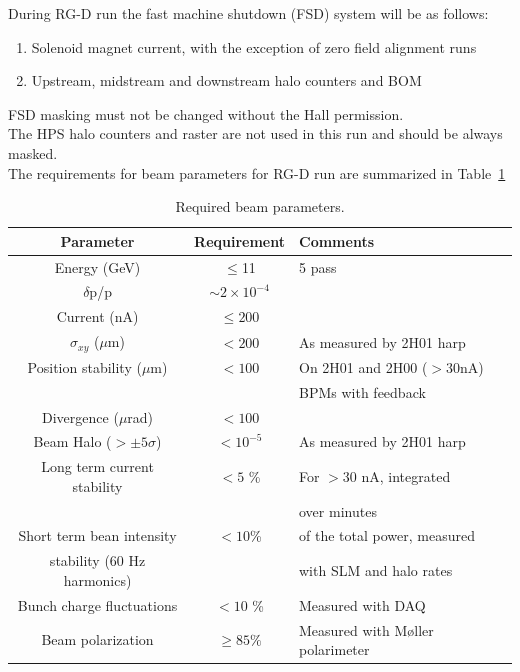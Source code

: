 \documentclass[11pt]{article}
\begin{document}

During RG-D run the fast machine shutdown (FSD) system will be as follows:
\begin{enumerate}
\item Solenoid magnet current, with the exception of zero field alignment runs
\item Upstream, midstream and downstream halo counters and BOM
\end{enumerate}

FSD masking must not be changed without the Hall permission.\\
The HPS halo counters and raster are not used in this run and should be always masked.\\

The requirements for beam parameters for RG-D run are summarized in Table~\ref{tab:beam_par}

 \begin{table}[htb]
\caption{Required beam parameters.}\label{tab:beam_par}
\centering
 \begin{tabular}{|c|c|l|}
\hline
Parameter & Requirement &Comments \\ \hline 
Energy (GeV) & $\leq$11   & 5 pass  \\  \hline
$\delta$p/p & $\sim 2\times 10^{-4}$ & \\ \hline 
Current (nA) & $\le 200$ & \\  \hline
$\sigma_{xy}$ ($\mu$m) &$ < 200$& As measured by 2H01 harp \\ \hline 
Position stability ($\mu$m) & $< 100$ & On 2H01 and 2H00 ($>30$nA) \\ 
&&BPMs with feedback \\ \hline
Divergence ($\mu$rad) & $< 100$&  \\ \hline 
Beam Halo ($> \pm 5\sigma$) &$< 10^{-5}$&As measured by 2H01 harp \\ \hline
Long term current stability & $< 5$ \% & For $>30$ nA, integrated \\
&&over minutes \\ \hline 
Short term bean intensity & $<10$\%& of the total power, measured \\stability (60 Hz harmonics) && with SLM and halo rates \\ \hline
Bunch charge fluctuations &$< 10$ \% & Measured with DAQ \\ \hline
Beam polarization & $\geq 85\%$&Measured with M{\o}ller polarimeter\\ \hline
 \end{tabular}
\end{table}
\end{document}
